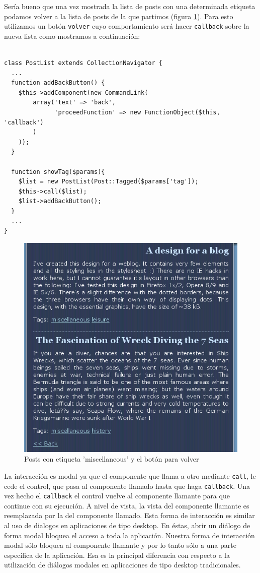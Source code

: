 Sería bueno que una vez mostrada la lista de posts con una determinada etiqueta podamos volver a la lista de posts de la que partimos (figura \ref{fig-blog2}). Para esto utilizamos un botón \verb"volver" cuyo comportamiento será hacer \verb"callback" sobre la nueva lista como mostramos a continuación:

\begin{verbatim}

class PostList extends CollectionNavigator {
  ...
  function addBackButton() {
    $this->addComponent(new CommandLink(
        array('text' => 'back',
              'proceedFunction' => new FunctionObject($this, 'callback')
        )
    ));
  }

  function showTag($params){
    $list = new PostList(Post::Tagged($params['tag']);
    $this->call($list);
    $list->addBackButton();
  }
  ...
}

\end{verbatim}


\begin{figure}[h]
	\centering
	\includegraphics[scale=0.7]{images/blog2.png}
 	\caption{Posts con etiqueta 'miscellaneous' y el botón para volver}
 	\label{fig-blog2}
\end{figure}

La interacción es modal ya que el componente que llama a otro mediante \verb"call", le cede el control, que pasa al componente llamado hasta que haga \verb'callback'. Una vez hecho el \verb'callback' el control vuelve al componente llamante para que continue con su ejecución. A nivel de vista, la vista del componente llamante es reemplazada por la del componente llamado. Esta forma de interacción es similar al uso de dialogos en aplicaciones de tipo desktop. En éstas, abrir un diálogo de forma modal bloquea el acceso a toda la aplicación. Nuestra forma de interacción modal sólo bloquea al componente llamante y por lo tanto sólo a una parte específica de la aplicación. Esa es la principal diferencia con respecto a la utilización de diálogos modales en aplicaciones de tipo desktop tradicionales.

